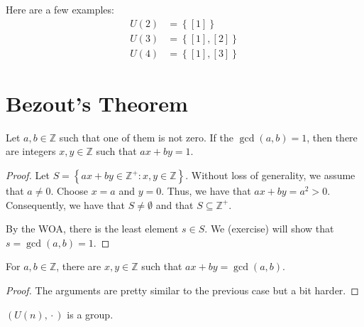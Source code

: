 \begin{nexample}
    Here are a few examples:
    \[
    \begin{aligned}
        U(2) &= \left\{[1]\right\} \\
        U(3) &= \left\{[1], [2]\right\} \\
        U(4) &= \left\{[1], [3]\right\}
    \end{aligned}
    \]
\end{nexample}

\section{Bezout's Theorem}

\begin{theorem}
    Let \(a, b \in \mathbb{Z}\) such that one of them is not zero. If the \(\gcd(a, b) = 1\), then there are integers \(x, y \in \mathbb{Z}\) such that \(ax + by = 1\).
\end{theorem}

\begin{proof}
    Let \(S = \left\{ax + by \in \mathbb{Z}^+ : x, y \in \mathbb{Z}\right\}\). Without loss of generality, we assume that \(a \neq 0\). Choose \(x = a\) and \(y = 0\). Thus, we have that \(ax + by = a^2 > 0\). Consequently, we have that \(S \neq \emptyset\) and that \(S \subseteq \mathbb{Z}^+\).

    By the WOA, there is the least element \(s \in S\). We (exercise) will show that \(s = \gcd(a, b) = 1\).
\end{proof}

\begin{theorem}\label{thm:bezout}
    For \(a, b \in \mathbb{Z}\), there are \(x, y \in \mathbb{Z}\) such that \(ax + by = \gcd(a, b)\).
\end{theorem}

\begin{proof}
    The arguments are pretty similar to the previous case but a bit harder.
\end{proof}

\begin{claim}
    \((U(n), {}\cdot{})\) is a group.
\end{claim}

